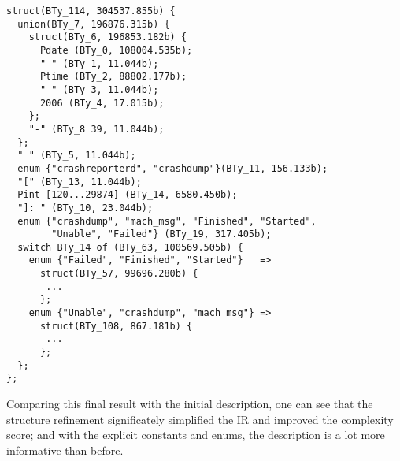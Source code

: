 {\small
\begin{verbatim}
struct(BTy_114, 304537.855b) {
  union(BTy_7, 196876.315b) {
    struct(BTy_6, 196853.182b) {
      Pdate (BTy_0, 108004.535b);
      " " (BTy_1, 11.044b);
      Ptime (BTy_2, 88802.177b);
      " " (BTy_3, 11.044b);
      2006 (BTy_4, 17.015b);
    };
    "-" (BTy_8 39, 11.044b);
  };
  " " (BTy_5, 11.044b);
  enum {"crashreporterd", "crashdump"}(BTy_11, 156.133b);
  "[" (BTy_13, 11.044b);
  Pint [120...29874] (BTy_14, 6580.450b);
  "]: " (BTy_10, 23.044b);
  enum {"crashdump", "mach_msg", "Finished", "Started", 
        "Unable", "Failed"} (BTy_19, 317.405b);
  switch BTy_14 of (BTy_63, 100569.505b) {
    enum {"Failed", "Finished", "Started"}   => 
      struct(BTy_57, 99696.280b) {
       ...
      };
    enum {"Unable", "crashdump", "mach_msg"} =>
      struct(BTy_108, 867.181b) {
       ...
      };
  };
};
\end{verbatim}
}

Comparing this final result with the initial description, one can see that
the structure refinement significately simplified the IR and improved the
complexity score; and with
the explicit constants and enums, the description is a lot more
informative than before.
